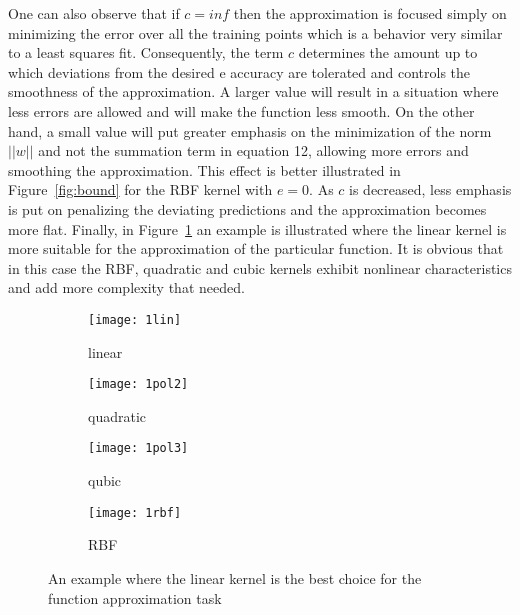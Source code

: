 \documentclass[conference,compsoc]{IEEEtran}
\begin{document}
One can also observe that if $c=inf$ then the approximation is focused simply on minimizing the error over all the training points which is a behavior very similar to a least squares fit. Consequently, the term $c$ determines the amount up to which deviations from the desired e accuracy are tolerated and controls the smoothness of the approximation. A larger value will result in a situation where less errors are allowed and will make the function less smooth. On the other hand, a small value will put greater emphasis on the minimization of the norm $||w||$ and not the summation term in equation 12, allowing more errors and smoothing the approximation. This effect is better illustrated in Figure~\ref{fig:bound} for the RBF kernel with $e=0$. As $c$ is decreased, less emphasis is put on penalizing the deviating predictions and the approximation becomes more flat. Finally, in Figure~\ref{fig:reglin} an example is illustrated where the linear kernel is more suitable for the approximation of the particular function. It is obvious that in this case the RBF, quadratic and cubic kernels exhibit nonlinear characteristics and add more complexity that needed.


\begin{figure}
\centering
  \begin{subfigure}{8cm}
    \centering\texttt{[image: 1lin]}
    
    \caption{linear}
  \end{subfigure}
  \begin{subfigure}{8cm}
    \centering\texttt{[image: 1pol2]}
    \caption{quadratic}
  \end{subfigure}
 \vspace{1cm}
  \begin{subfigure}{8cm}
    \centering\texttt{[image: 1pol3]}
    \caption{qubic}
  \end{subfigure}
  \begin{subfigure}{8cm}
    \centering\texttt{[image: 1rbf]}
    \caption{RBF}
  \end{subfigure}
 
  \caption{An example where the linear kernel is the best choice for the function approximation task}
   \label{fig:reglin}
\end{figure}
\end{document}
